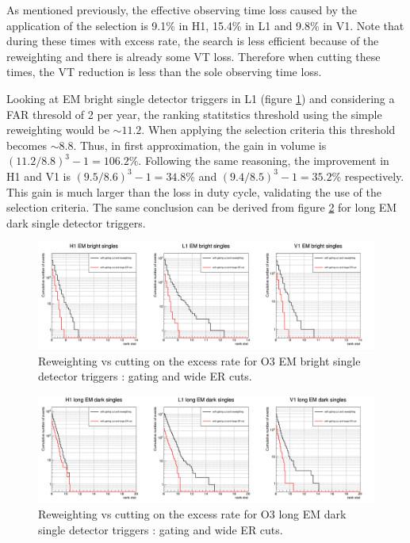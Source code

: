 As mentioned previously, the effective observing time loss caused by the application of the selection is 9.1\% in H1, 15.4\% in L1 and 9.8\% in V1.
Note that during these times with excess rate, the search is less efficient because of the reweighting and there is already some VT loss.
Therefore when cutting these times, the VT reduction is less than the sole observing time loss.

Looking at EM bright single detector triggers in L1 (figure \ref{fig:embright_rankstat_allcut}) and considering a FAR thresold of 2 per year, the ranking statitstics threshold using the simple reweighting would be $\sim 11.2$.
When applying the selection criteria this threshold becomes $\sim 8.8$.
Thus, in first approximation, the gain in volume is $(11.2/8.8)^3-1 = 106.2\%$.
Following the same reasoning, the improvement in H1 and V1 is $(9.5/8.6)^3-1 = 34.8\%$ and $(9.4/8.5)^3-1 = 35.2\%$ respectively.
This gain is much larger than the loss in duty cycle, validating the use of the selection criteria.
The same conclusion can be derived from figure \ref{fig:emdark_rankstat_allcut} for long EM dark single detector triggers.


\begin{figure}[ht]
  \centering
  \includegraphics[width=\linewidth]{sectionSelection/plotsEMbright/cRankStatCutAll.png}
  \caption{Reweighting vs cutting  on the excess rate for O3 EM bright single detector triggers : gating and wide ER cuts.}
  \label{fig:embright_rankstat_allcut}
\end{figure}
% 
\begin{figure}[ht]
  \centering
  \includegraphics[width=\linewidth]{sectionSelection/plotsEMdark/cRankStatCutAll.png}
  \caption{Reweighting vs cutting on the excess rate for O3 long EM dark single detector triggers : gating and wide ER cuts.}
  \label{fig:emdark_rankstat_allcut}
\end{figure}




